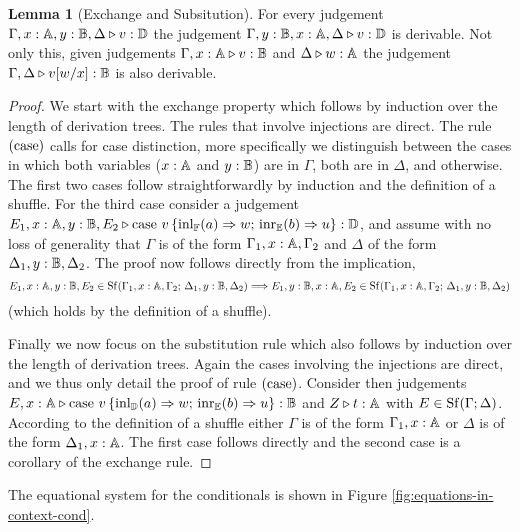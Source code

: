 \documentclass[10pt,a4paper]{amsart}
\theoremstyle{definition}
\theoremstyle{definition}
\theoremstyle{definition}
\newtheorem{lemma}[definition]{Lemma}
\theoremstyle{definition}
\theoremstyle{definition}
\theoremstyle{definition}
\begin{document}
\begin{lemma}[Exchange and Subsitution]
\label{lem:exh_and_sub} 
For every judgement $\Gamma,x: \mathbb{A}, y: \mathbb{B}, \Delta \triangleright v: \mathbb{D}$ the
judgement $\Gamma, y:\mathbb{B}, x:\mathbb{A}, \Delta \triangleright v:
\mathbb{D}$ is derivable. Not only this, given judgements  $\Gamma,x:\mathbb{A} \triangleright
v: \mathbb{B}$ and $\Delta \triangleright w: \mathbb{A}$ the judgement $\Gamma, \Delta \triangleright
v[w/x]: \mathbb{B}$ is also derivable.
\end{lemma}


\begin{proof}
We start with the exchange property which follows by induction over the length
of derivation trees. The rules that involve injections are direct.  The rule
$(\mathrm{case})$ calls for case distinction, more specifically we  distinguish
between the cases in which both variables ($x : \mathbb{A}$ and $y : \mathbb{B}$) are
in $\Gamma$, both are in $\Delta$, and otherwise. The first two cases follow
straightforwardly by induction and the definition of a shuffle. For the third
case consider a judgement $E_1,x : \mathbb{A}, y : \mathbb{B}, E_2 \triangleright \text{case }
v\, \{\mathrm{inl}_{\mathbb{F}}(a) \Rightarrow w ; \, \mathrm{inr}_{\mathbb{E}}(b) \Rightarrow u \}:
\mathbb{D}$, and assume with no loss of generality that $\Gamma$ is of the form
$\Gamma_1, x : \mathbb{A}, \Gamma_2$ and $\Delta$ of the form $\Delta_1, y :
\mathbb{B}, \Delta_2$. The proof now follows directly from the implication,
\[
        E_1, x : \mathbb{A}, y : \mathbb{B}, E_2 \in \mathrm{Sf}(\Gamma_1, x : \mathbb{A}, \Gamma_2 ; \,
        \Delta_1, y : \mathbb{B}, \Delta_2)
        \Longrightarrow
        E_1, y : \mathbb{B}, x : \mathbb{A}, E_2 \in \mathrm{Sf}(\Gamma_1, x : \mathbb{A}, \Gamma_2 ; \,
        \Delta_1, y : \mathbb{B}, \Delta_2)
\]
(which holds by the definition of a shuffle).

Finally we now focus on the substitution rule which also follows by induction over the
length of derivation trees. Again the cases involving the injections are direct,
and we thus only detail the proof of rule $(\mathrm{case})$. Consider then
judgements $E,x : \mathbb{A} \triangleright \text{case } v\, \{\mathrm{inl}_{\mathbb{D}}(a) \Rightarrow
w ; \, \mathrm{inr}_{\mathbb{E}}(b) \Rightarrow u \}: \mathbb{B}$ and
$Z \triangleright t : \mathbb{A}$ with $E \in \mathrm{Sf}(\Gamma; \Delta)$. According to the definition
of a shuffle either $\Gamma$ is of the form $\Gamma_1, x: \mathbb{A}$ or $\Delta$ is
of the form $\Delta_1, x : \mathbb{A}$. The first case follows directly and the second case
is a corollary of the exchange rule.
\end{proof}

The equational system for the conditionals is shown in Figure
\ref{fig:equations-in-context-cond}.
\end{document}

